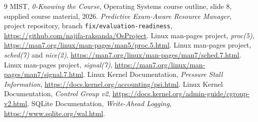 \documentclass[12pt,a4paper]{article}
\newcommand{\code}[1]{\texttt{#1}}
\begin{document}
\begin{thebibliography}{9}
 MIST, \emph{0-Knowing the Course}, Operating Systems course outline, slide 8, supplied course material, 2026.
 \emph{Predictive Exam-Aware Resource Manager}, project repository, branch \code{fix/evaluation-readiness}, \url{https://github.com/najifa-raksanda/OsProject}.
 Linux man-pages project, \emph{proc(5)}, \url{https://man7.org/linux/man-pages/man5/proc.5.html}.
 Linux man-pages project, \emph{sched(7)} and \emph{nice(2)}, \url{https://man7.org/linux/man-pages/man7/sched.7.html}.
 Linux man-pages project, \emph{signal(7)}, \url{https://man7.org/linux/man-pages/man7/signal.7.html}.
 Linux Kernel Documentation, \emph{Pressure Stall Information}, \url{https://docs.kernel.org/accounting/psi.html}.
 Linux Kernel Documentation, \emph{Control Group v2}, \url{https://docs.kernel.org/admin-guide/cgroup-v2.html}.
 SQLite Documentation, \emph{Write-Ahead Logging}, \url{https://www.sqlite.org/wal.html}.
\end{thebibliography}
\end{document}
